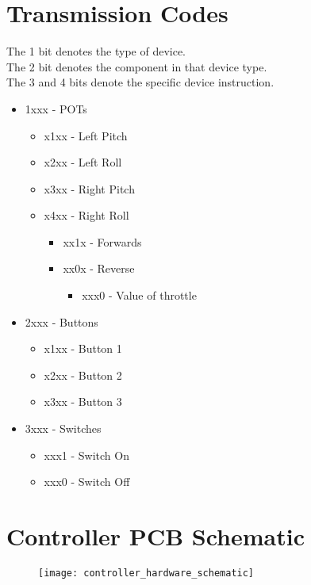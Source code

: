\documentclass [11pt]{article}
\begin{document}
\section{Transmission Codes}\label{app:transmission_codes}
{\parindent0pt
The 1 bit denotes the type of device.\\
The 2 bit denotes the component in that device type.\\
The 3 and 4 bits denote the specific device instruction.\\
}
\begin{itemize}
\item 1xxx - POTs
    \begin{itemize}
        \item x1xx - Left Pitch
        \item x2xx - Left Roll
	    \item x3xx - Right Pitch
		\item x4xx - Right Roll
		\begin{itemize}
			\item xx1x - Forwards
			\item xx0x - Reverse
			\begin{itemize}
				\item xxx0 - Value of throttle
			\end{itemize}
		\end{itemize}
     \end{itemize}
\item 2xxx - Buttons
	\begin{itemize}
		\item x1xx - Button 1
		\item x2xx - Button 2
		\item x3xx - Button 3
	\end{itemize}
\item 3xxx - Switches
	\begin{itemize}
		\item xxx1 - Switch On
		\item xxx0 - Switch Off
	\end{itemize}
\end{itemize}

\section{Controller PCB Schematic}\label{app:controller_hardware_schematic}
\begin{figure}[H]
\centerline{\texttt{[image: controller\_hardware\_schematic]}}
\end{figure}
\end{document}
